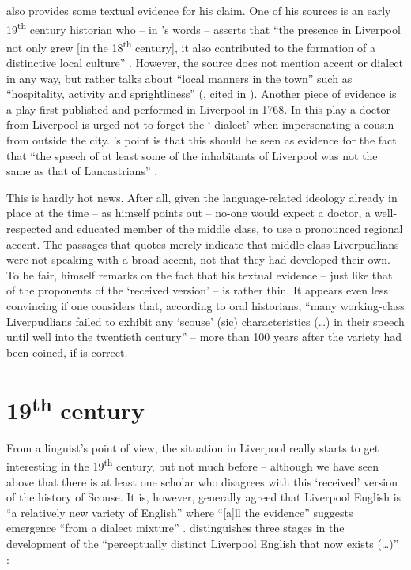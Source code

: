 \textcite{crowley2012} also provides some textual evidence for his claim. One of his sources is an early 19\textsuperscript{th} century historian who -- in \citeauthor{crowley2012}'s words -- asserts that ``the  presence in Liverpool not only grew [in the 18\textsuperscript{th} century], it also contributed to the formation of a distinctive local culture'' \citeyearpar[30]{crowley2012}.
However, the source does not mention accent or dialect in any way, but rather talks about ``local manners in the town'' such as ``hospitality, activity and sprightliness'' (\citealt{troughton1810}, cited in \citealt[30]{crowley2012}).
Another piece of evidence is a play first published and performed in Liverpool in 1768.
In this play a doctor from Liverpool is urged not to forget the ` dialect' when impersonating a cousin from outside the city.
\citeauthor{crowley2012}'s point is that this should be seen as evidence for the fact that ``the speech of at least some of the inhabitants of Liverpool was not the same as that of Lancastrians'' \parencite[cf.][32--35]{crowley2012}.

This is hardly hot news.
After all, given the language-related ideology already in place at the time -- as \citeauthor{crowley2012} himself points out \citeyearpar[23]{crowley2012} -- no-one would expect a doctor, a well-respected and educated member of the middle class, to use a pronounced regional accent.
The passages that \citeauthor{crowley2012} quotes merely indicate that middle-class Liverpudlians were not speaking with a broad  accent, not that they had developed their own.
To be fair, \citeauthor{crowley2012} himself remarks on the fact that his textual evidence -- just like that of the proponents of the `received version' -- is rather thin.
It appears even less convincing if one considers that, according to oral historians, ``many working-class Liverpudlians failed to exhibit any `scouse' (sic) characteristics (\ldots) in their speech until well into the twentieth century''  \citep[43--44]{belchem2006d} -- more than 100 years after the variety had been coined, if \citeauthor{crowley2012} is correct.


	\section{19\textsuperscript{th} century}\label{sec.hist.19}

From a linguist's point of view, the situation in Liverpool really starts to get interesting in the 19\textsuperscript{th} century, but not much before -- although we have seen above that there is at least one scholar who disagrees with this `received' version of the history of Scouse.
It is, however, generally agreed that Liverpool English is ``a relatively new variety of English'' where ``[a]ll the evidence'' suggests emergence ``from a dialect mixture'' \citep[113 and 121]{honeybone2007}.
\citeauthor{honeybone2007} distinguishes three stages in the development of the ``perceptually distinct Liverpool English that now exists (\dots)'' \citeyearpar[119]{honeybone2007}:


